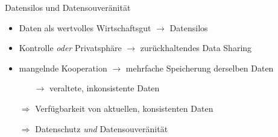 \begin{frame}{Datensilos und Datensouveränität}
    \begin{itemize}
        \item Daten als wertvolles Wirtschaftsgut $\to$ Datensilos
        \item Kontrolle \emph{oder} Privatsphäre $\to$ zurückhaltendes Data Sharing
        \item mangelnde Kooperation $\to$ mehrfache Speicherung derselben Daten
        \begin{itemize}
            \item[$\to$] veraltete, inkonsistente Daten
        \end{itemize}

        \pause
        \item[$\Rightarrow$] Verfügbarkeit von aktuellen, konsistenten Daten
        \item[$\Rightarrow$] Datenschutz \emph{und} Datensouveränität
    \end{itemize}
\end{frame}
